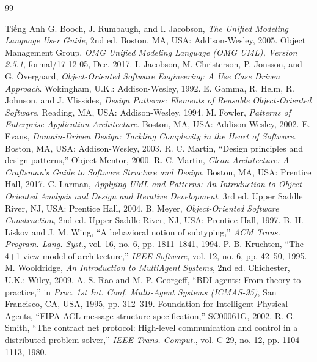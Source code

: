 \begin{thebibliography}{99}
\begin{bibsection}{Tiếng Anh}
	G. Booch, J. Rumbaugh, and I. Jacobson, \textit{The Unified Modeling Language User Guide}, 2nd ed. Boston, MA, USA: Addison-Wesley, 2005.
	Object Management Group, \textit{OMG Unified Modeling Language (OMG UML), Version 2.5.1}, formal/17-12-05, Dec. 2017.
	I. Jacobson, M. Christerson, P. Jonsson, and G. Övergaard, \textit{Object-Oriented Software Engineering: A Use Case Driven Approach}. Wokingham, U.K.: Addison-Wesley, 1992.
	E. Gamma, R. Helm, R. Johnson, and J. Vlissides, \textit{Design Patterns: Elements of Reusable Object-Oriented Software}. Reading, MA, USA: Addison-Wesley, 1994.
	M. Fowler, \textit{Patterns of Enterprise Application Architecture}. Boston, MA, USA: Addison-Wesley, 2002.
	E. Evans, \textit{Domain-Driven Design: Tackling Complexity in the Heart of Software}. Boston, MA, USA: Addison-Wesley, 2003.
	R. C. Martin, ``Design principles and design patterns,'' Object Mentor, 2000.
	R. C. Martin, \textit{Clean Architecture: A Craftsman's Guide to Software Structure and Design}. Boston, MA, USA: Prentice Hall, 2017.
	C. Larman, \textit{Applying UML and Patterns: An Introduction to Object-Oriented Analysis and Design and Iterative Development}, 3rd ed. Upper Saddle River, NJ, USA: Prentice Hall, 2004.
	B. Meyer, \textit{Object-Oriented Software Construction}, 2nd ed. Upper Saddle River, NJ, USA: Prentice Hall, 1997.
	B. H. Liskov and J. M. Wing, ``A behavioral notion of subtyping,'' \textit{ACM Trans. Program. Lang. Syst.}, vol. 16, no. 6, pp. 1811--1841, 1994.
	P. B. Kruchten, ``The 4+1 view model of architecture,'' \textit{IEEE Software}, vol. 12, no. 6, pp. 42--50, 1995.
	M. Wooldridge, \textit{An Introduction to MultiAgent Systems}, 2nd ed. Chichester, U.K.: Wiley, 2009.
	A. S. Rao and M. P. Georgeff, ``BDI agents: From theory to practice,'' in \textit{Proc. 1st Int. Conf. Multi-Agent Systems (ICMAS-95)}, San Francisco, CA, USA, 1995, pp. 312--319.
	Foundation for Intelligent Physical Agents, ``FIPA ACL message structure specification,'' SC00061G, 2002.
	R. G. Smith, ``The contract net protocol: High-level communication and control in a distributed problem solver,'' \textit{IEEE Trans. Comput.}, vol. C-29, no. 12, pp. 1104--1113, 1980.

\end{bibsection}
\end{thebibliography}
